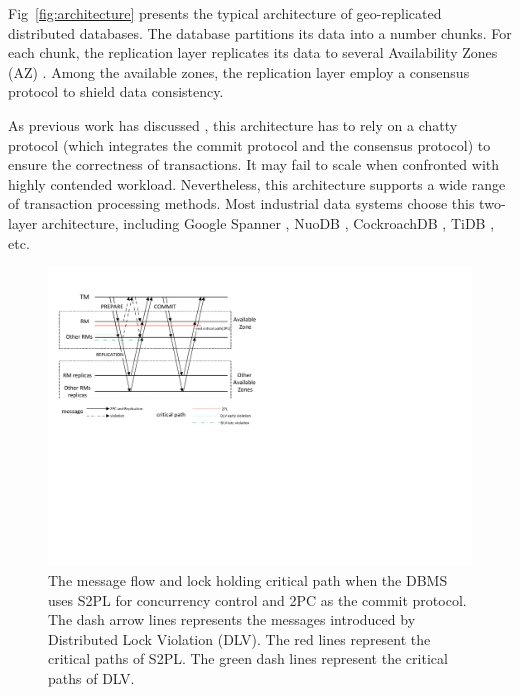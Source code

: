 \documentclass[conference]{IEEEtran}
\begin{document}
Fig~\ref{fig:architecture} presents the typical architecture of geo-replicated distributed databases.
The database partitions its data into a number chunks.
For each chunk, the replication layer replicates its data to several Availability Zones (AZ) \cite{Aurora:conf/sigmod/VerbitskiGSCGBM18}.
Among the available zones, the replication layer employ a consensus protocol to shield data consistency.

As previous work has discussed \cite{Calvin:conf/sigmod/ThomsonDWRSA12}\cite{Tapir:conf/sosp/ZhangSSKP15}\cite{Janus:conf/osdi/MuNLL16},
this architecture has to rely on a chatty protocol (which integrates the commit protocol and the consensus protocol) to ensure the correctness of transactions.
It may fail to scale when confronted with highly contended workload.
Nevertheless, this architecture supports a wide range of transaction processing methods.
Most industrial data systems choose this two-layer architecture, including Google Spanner \cite{Spanner:conf/osdi/CorbettDEFFFGGHHHKKLLMMNQRRSSTWW12}\cite{Spanner:conf/sigmod/BaconBBCDFFGJKL17},
NuoDB \cite{NuoDB}, CockroachDB \cite{CockroachDB}, TiDB \cite{TiDB}, etc.

\begin{figure}[htbp]
  \centerline{\includegraphics[scale=0.62]{figure/message_flow.pdf}}
  \caption{The message flow and lock holding critical path when the DBMS uses S2PL for concurrency control and 2PC as the commit protocol.
The dash arrow lines represents the messages introduced by Distributed Lock Violation (DLV). The red lines represent the critical paths of S2PL.
The green dash lines represent the critical paths of DLV.}
  \label{fig:two_layers_architecture}
\end{figure}
\end{document}
